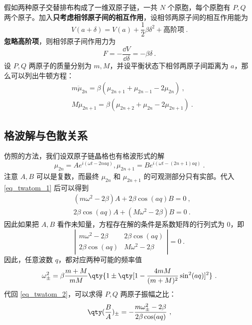 
假如两种原子交替排布构成了一维双原子链，一共 $N$ 个原胞，每个原胞有 $P,Q$ 两个原子。加入\textbf{只考虑相邻原子间的相互作用}，设相邻两原子间的相互作用能为
\begin{equation}
V(a+\delta)=V(a)+\frac{1}{2}\beta \delta^2+\text{高阶项}~.
\end{equation}
\textbf{忽略高阶项}，则相邻原子间作用力为
\begin{equation}
F=-\frac{\dd V}{\dd \delta}=-\beta \delta~.
\end{equation}
设 $P,Q$ 两原子的质量分别为 $m,M$，并设平衡状态下相邻两原子间距离为 $a$，那么可以列出牛顿方程：
\begin{equation}\label{eq_twatom_1}
\begin{aligned}
&m\ddot \mu_{2n}=\beta(\mu_{2n+1}+\mu_{2n-1}-2\mu_{2n})~,\\
&M\ddot \mu_{2n+1}=\beta(\mu_{2n+2}+\mu_{2n}-2\mu_{2n+1})~.
\end{aligned}
\end{equation}

\subsection{格波解与色散关系}
仿照的方法，我们设双原子链晶格也有格波形式的解
\begin{equation}\label{eq_twatom_3}
\mu_{2n}=A e^{i(\omega t - 2naq)},\mu_{2n+1}=B  e^{i(\omega t - (2n+1)aq)}~.
\end{equation}
注意 $A,B$ 可以是复数，而最终 $\mu_{2n}$ 和 $\mu_{2n+1}$ 的可观测部分只有实部。代入\autoref{eq_twatom_1} 后可以得到
\begin{equation}\label{eq_twatom_2}
\begin{aligned}
&(m\omega^2-2\beta)A+2\beta\cos(aq)B=0~,\\
&2\beta\cos(aq)A+(M\omega^2-2\beta)B=0~.
\end{aligned}
\end{equation}
因此如果把 $A,B$ 看作未知量，方程存在解的条件是系数矩阵的行列式为 $0$，即
\begin{equation}
\left|
\begin{matrix}
m\omega^2-2\beta&2\beta\cos(aq)\\
2\beta\cos(aq)&M\omega^2-2\beta
\end{matrix}
\right|=0~.
\end{equation}
因此，任意波数 $q$，都对应两种可能的频率值
\begin{equation}
\omega_{\pm}^2=\beta\frac{m+M}{mM}\qty{1\pm \qty[1-\frac{4mM}{(m+M)^2}\sin^2(aq)]^2}~.
\end{equation}
代回 \autoref{eq_twatom_2}，可以求得 $P,Q$ 两原子振幅之比：
\begin{equation}\label{eq_twatom_4}
\qty(\frac{B}{A})_{\pm}=-\frac{m\omega_{\pm}^2-2\beta}{2\beta\cos(aq)}~,
\end{equation}

